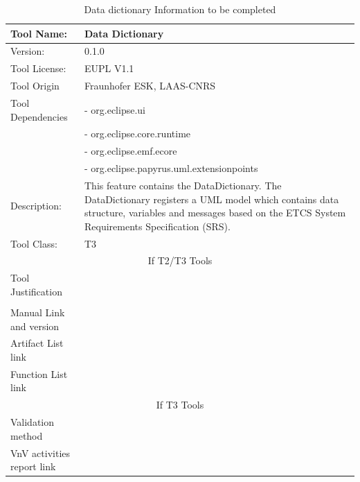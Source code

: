 \begin{table}[htbp]
\centering
\caption{\label{tbl:datadict}Data dictionary  Information to be completed}
\begin{tabular}{|l|p{7cm}|}\hline
Tool Name: &Data Dictionary\\\hline
Version: &0.1.0 \\\hline
Tool License:& EUPL V1.1\\\hline
Tool Origin & Fraunhofer ESK, LAAS-CNRS \\
Tool Dependencies & - org.eclipse.ui \\
&-  org.eclipse.core.runtime\\
& - org.eclipse.emf.ecore\\
& - org.eclipse.papyrus.uml.extensionpoints \\ \hline
Description: & This feature contains the DataDictionary. The DataDictionary registers a UML model which contains data structure, variables and messages based on the ETCS System Requirements Specification (SRS). \\ \hline
Tool Class: & T3 \\\hline
\multicolumn{2}{|c|}{If T2/T3 Tools}\\\hline
Tool Justification & \\
 & \\ \hline
Manual Link and version & \\\hline
Artifact List link & \\\hline
Function List link& \\\hline
\multicolumn{2}{|c|}{If T3 Tools}\\\hline
Validation method& \\\hline
VnV activities report link&\\\hline
\end{tabular}
\end{table}

